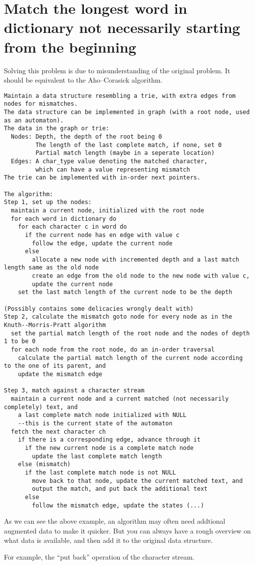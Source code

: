 \documentclass{article}
\begin{document}
\section*{Match the longest word in dictionary not necessarily starting from the beginning}
Solving this problem is due to misunderstanding of the original problem.
It should be equivalent to the Aho--Corasick algorithm.
\small
\begin{verbatim}
Maintain a data structure resembling a trie, with extra edges from nodes for mismatches.
The data structure can be implemented in graph (with a root node, used as an automaton).
The data in the graph or trie:
  Nodes: Depth, the depth of the root being 0
         The length of the last complete match, if none, set 0
         Partial match length (maybe in a seperate location)
  Edges: A char_type value denoting the matched character,
         which can have a value representing mismatch
The trie can be implemented with in-order next pointers.

The algorithm:
Step 1, set up the nodes:
  maintain a current node, initialized with the root node
  for each word in dictionary do
    for each character c in word do
      if the current node has en edge with value c
        follow the edge, update the current node
      else
        allocate a new node with incremented depth and a last match length same as the old node
        create an edge from the old node to the new node with value c,
        update the current node
    set the last match length of the current node to be the depth

(Possibly contains some delicacies wrongly dealt with)
Step 2, calculate the mismatch goto node for every node as in the Knuth--Morris-Pratt algorithm
  set the partial match length of the root node and the nodes of depth 1 to be 0
  for each node from the root node, do an in-order traversal
    calculate the partial match length of the current node according to the one of its parent, and
    update the mismatch edge

Step 3, match against a character stream
  maintain a current node and a current matched (not necessarily completely) text, and
    a last complete match node initialized with NULL
    --this is the current state of the automaton
  fetch the next character ch
    if there is a corresponding edge, advance through it
      if the new current node is a complete match node
        update the last complete match length
    else (mismatch)
      if the last complete match node is not NULL
        move back to that node, update the current matched text, and
        output the match, and put back the additional text
      else
        follow the mismatch edge, update the states (...)

\end{verbatim}
As we can see the above example, an algorithm may often need addtional augmented data to make it quicker.
But you can always have a rough overview on what data is available, and then add it to the original data structure.

For example, the ``put back'' operation of the character stream.
\end{document}
